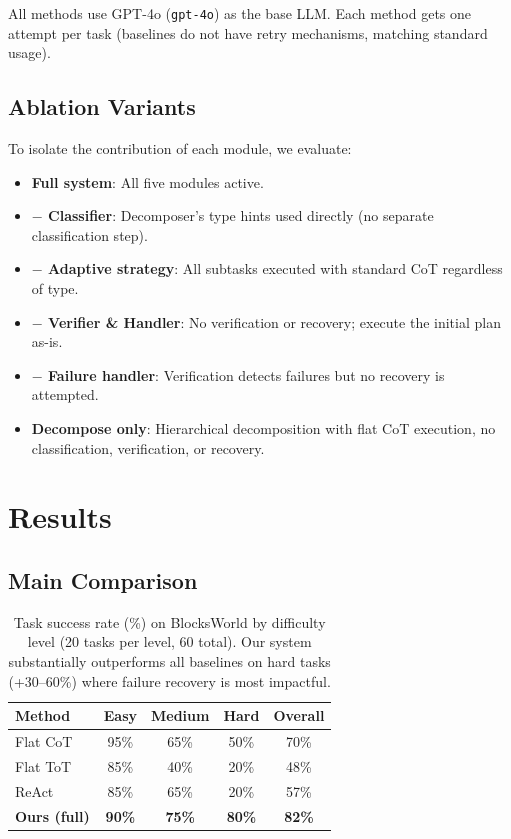 \documentclass{article}
\begin{document}
All methods use GPT-4o (\texttt{gpt-4o}) as the base LLM. Each method gets one attempt per task (baselines do not have retry mechanisms, matching standard usage).

\subsection{Ablation Variants}

To isolate the contribution of each module, we evaluate:
\begin{itemize}[leftmargin=*]
    \item \textbf{Full system}: All five modules active.
    \item \textbf{$-$ Classifier}: Decomposer's type hints used directly (no separate classification step).
    \item \textbf{$-$ Adaptive strategy}: All subtasks executed with standard CoT regardless of type.
    \item \textbf{$-$ Verifier \& Handler}: No verification or recovery; execute the initial plan as-is.
    \item \textbf{$-$ Failure handler}: Verification detects failures but no recovery is attempted.
    \item \textbf{Decompose only}: Hierarchical decomposition with flat CoT execution, no classification, verification, or recovery.
\end{itemize}

\section{Results}

\subsection{Main Comparison}

\begin{table}[h]
\centering
\begin{tabular}{lcccc}
\toprule
\textbf{Method} & \textbf{Easy} & \textbf{Medium} & \textbf{Hard} & \textbf{Overall} \\
\midrule
Flat CoT & 95\% & 65\% & 50\% & 70\% \\
Flat ToT & 85\% & 40\% & 20\% & 48\% \\
ReAct & 85\% & 65\% & 20\% & 57\% \\
\textbf{Ours (full)} & \textbf{90\%} & \textbf{75\%} & \textbf{80\%} & \textbf{82\%} \\
\bottomrule
\end{tabular}
\caption{Task success rate (\%) on BlocksWorld by difficulty level (20 tasks per level, 60 total). Our system substantially outperforms all baselines on hard tasks (+30--60\%) where failure recovery is most impactful.}
\label{tab:main_results}
\end{table}
\end{document}
